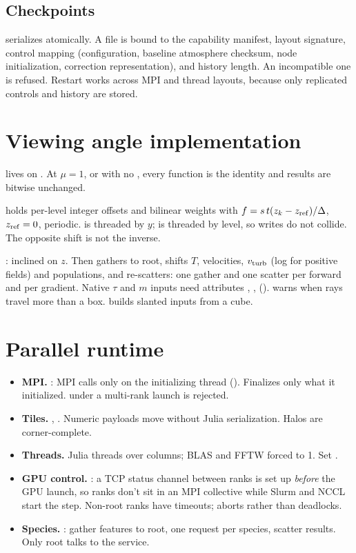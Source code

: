 \subsection{Checkpoints}
 serializes atomically. A file is bound to the capability manifest, layout signature, control mapping (configuration, baseline atmosphere checksum, node initialization, correction representation), and history length. An incompatible one is refused. Restart works across MPI and thread layouts, because only replicated controls and history are stored.

\section{Viewing angle implementation}
 lives on . At $\mu=1$, or with no \code{[view]}, every function is the identity and results are bitwise unchanged.

 holds per-level integer offsets and bilinear weights with $f=s\,t(z_k-z_{\rm ref})/\Delta$, $z_{\rm ref}=0$, periodic.  is threaded by $y$;  is threaded by level, so writes do not collide. The opposite shift is not the inverse.

: inclined on $z$. Then  gathers to root, shifts $T$, velocities, $v_{\rm turb}$ (log for positive fields) and populations, and re-scatters: one gather and one scatter per forward and per gradient. Native $\tau$ and $m$ inputs need attributes , ,  ().  warns when rays travel more than a box.  builds slanted inputs from a cube.

\section{Parallel runtime}
\begin{itemize}
\item \textbf{MPI.} : MPI calls only on the initializing thread (). Finalizes only what it initialized.  under a multi-rank launch is rejected.
\item \textbf{Tiles.} , . Numeric payloads move without Julia serialization. Halos are corner-complete.
\item \textbf{Threads.} Julia threads over columns; BLAS and FFTW forced to 1. Set .
\item \textbf{GPU control.} : a TCP status channel between ranks is set up \emph{before} the GPU launch, so ranks don't sit in an MPI collective while Slurm and NCCL start the step. Non-root ranks have timeouts;  aborts rather than deadlocks.
\item \textbf{Species.} : gather features to root, one request per species, scatter results. Only root talks to the service.
\end{itemize}

